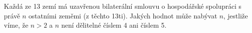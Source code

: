 \subsubsection{}
Každá ze 13 zemí má uzavřenou bilaterální smlouvu o hospodářské spolupráci s
právě $n$ ostatními zeměmi (z těchto 13ti). Jakých hodnot může nabývat $n$,
jestliže víme, že $n>2$ a $n$ není dělitelné číslem 4 ani číslem 5.
